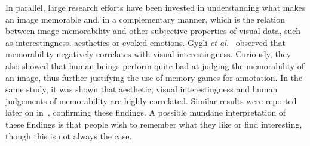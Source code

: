\documentclass{sig-alternate-05-2015}
\begin{document}
In parallel, large research efforts have been invested in understanding what makes an image memorable and, in a complementary manner, which is the relation between image memorability and other subjective properties of visual data, such as interestingness, aesthetics or evoked emotions. Gygli \textit{et al.}~\cite{gygli2013interestingness} observed that memorability negatively correlates with visual interestingness. Curiously, they also showed that human beings perform quite bad at judging the memorability of an image, thus further justifying the use of memory games for annotation. In the same study, it was shown that aesthetic, visual interestingness and human judgements of memorability are highly correlated. Similar results were reported later on in~\cite{isola2014what}, confirming these findings. A possible mundane interpretation of these findings is that people wish to remember what they like or find interesting, though this is not always the case.
\end{document}
